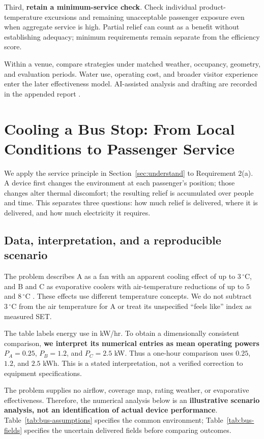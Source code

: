 \documentclass[12pt]{article}
\begin{document}
Third, \textbf{retain a minimum-service check}. Check individual product-temperature excursions and remaining unacceptable passenger exposure even when aggregate service is high. Partial relief can count as a benefit without establishing adequacy; minimum requirements remain separate from the efficiency score.

Within a venue, compare strategies under matched weather, occupancy, geometry, and evaluation periods. Water use, operating cost, and broader visitor experience enter the later effectiveness model. AI-assisted analysis and drafting are recorded in the appended report \cite{codex}.

\clearpage
\section{Cooling a Bus Stop: From Local Conditions to Passenger Service}
\label{sec:bus}

We apply the service principle in Section~\ref{sec:understand} to Requirement 2(a). A device first changes the environment at each passenger's position; those changes alter thermal discomfort; the resulting relief is accumulated over people and time. This separates three questions: how much relief is delivered, where it is delivered, and how much electricity it requires.

\subsection{Data, interpretation, and a reproducible scenario}

The problem describes A as a fan with an apparent cooling effect of up to $3\,^{\circ}\mathrm C$, and B and C as evaporative coolers with air-temperature reductions of up to $5$ and $8\,^{\circ}\mathrm C$ \cite{problem}. These effects use different temperature concepts. We do not subtract $3\,^{\circ}\mathrm C$ from the air temperature for A or treat its unspecified ``feels like'' index as measured SET.

The table labels energy use in kW/hr. To obtain a dimensionally consistent comparison, \textbf{we interpret its numerical entries as mean operating powers} $P_A=0.25$, $P_B=1.2$, and $P_C=2.5$ kW. Thus a one-hour comparison uses $0.25$, $1.2$, and $2.5$ kWh. This is a stated interpretation, not a verified correction to equipment specifications.

The problem supplies no airflow, coverage map, rating weather, or evaporative effectiveness. Therefore, the numerical analysis below is an \textbf{illustrative scenario analysis, not an identification of actual device performance}. Table~\ref{tab:bus-assumptions} specifies the common environment; Table~\ref{tab:bus-fields} specifies the uncertain delivered fields before comparing outcomes.
\end{document}
